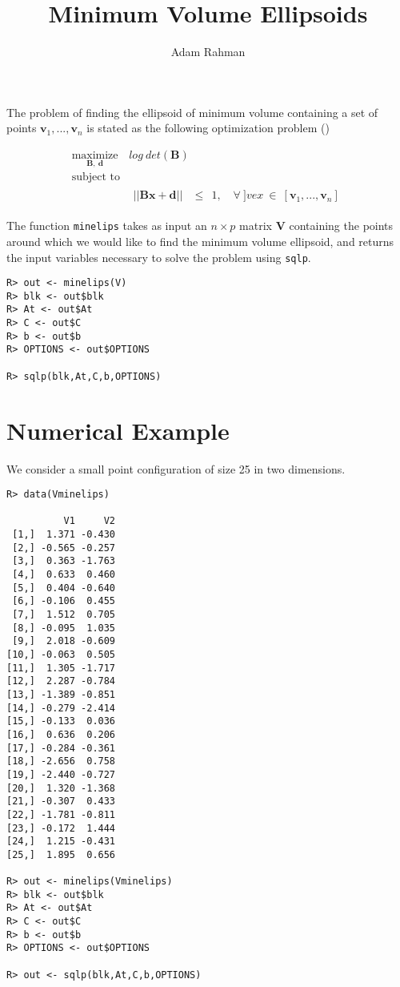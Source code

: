 \documentclass{article}
\author{Adam Rahman}
\title{Minimum Volume Ellipsoids}
\newcommand{\ve}[1]{\mathbf{#1}}           %
\newcommand{\m}[1]{\mathbf{#1}}               %
\begin{document}
\maketitle

The problem of finding the ellipsoid of minimum volume containing a set of points $\ve{v}_{1},...,\ve{v}_{n}$ is stated as the following optimization problem (\cite{vandenberghe1998determinant})

\[
\begin{array}{ll}
\underset{\m{B},~\ve{d}}{\text{maximize}} & log~det(\m{B}) \\
\text{subject to} & \\
& \begin{array}{rl}
||\m{B}\ve{x} + \ve{d}|| &\leq~~ 1, \quad \forall~]ve{x}~\in~[\ve{v}_{1},...,\ve{v}_{n}]
\end{array}
\end{array}
\]

The function \verb!minelips! takes as input an $n \times p$ matrix $\m{V}$ containing the points around which we would like to find the minimum volume ellipsoid, and returns the input variables necessary to solve the problem using \verb!sqlp!.

\begin{verbatim}
R> out <- minelips(V)
R> blk <- out$blk
R> At <- out$At
R> C <- out$C
R> b <- out$b
R> OPTIONS <- out$OPTIONS

R> sqlp(blk,At,C,b,OPTIONS)
\end{verbatim}

\section*{Numerical Example}

We consider a small point configuration of size 25 in two dimensions.

\begin{verbatim}
R> data(Vminelips)

          V1     V2
 [1,]  1.371 -0.430
 [2,] -0.565 -0.257
 [3,]  0.363 -1.763
 [4,]  0.633  0.460
 [5,]  0.404 -0.640
 [6,] -0.106  0.455
 [7,]  1.512  0.705
 [8,] -0.095  1.035
 [9,]  2.018 -0.609
[10,] -0.063  0.505
[11,]  1.305 -1.717
[12,]  2.287 -0.784
[13,] -1.389 -0.851
[14,] -0.279 -2.414
[15,] -0.133  0.036
[16,]  0.636  0.206
[17,] -0.284 -0.361
[18,] -2.656  0.758
[19,] -2.440 -0.727
[20,]  1.320 -1.368
[21,] -0.307  0.433
[22,] -1.781 -0.811
[23,] -0.172  1.444
[24,]  1.215 -0.431
[25,]  1.895  0.656

R> out <- minelips(Vminelips)
R> blk <- out$blk
R> At <- out$At
R> C <- out$C
R> b <- out$b
R> OPTIONS <- out$OPTIONS

R> out <- sqlp(blk,At,C,b,OPTIONS)
\end{verbatim}
\end{document}
